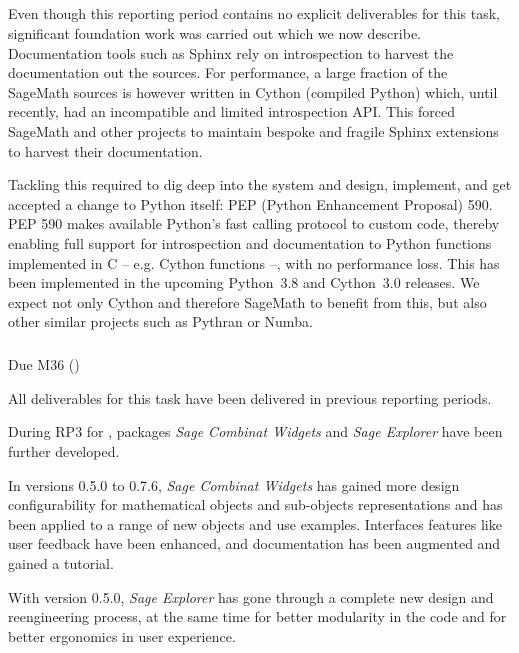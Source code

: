 \subparagraph{}
\label{UI@sage-sphinx}

Even though this reporting period contains no explicit deliverables
for this task, significant foundation work was carried out which we
now describe. Documentation tools such as Sphinx rely on introspection
to harvest the documentation out the sources. For performance, a large
fraction of the SageMath sources is however written in Cython
(compiled Python) which, until recently, had an incompatible and
limited introspection API. This forced SageMath and other projects to
maintain bespoke and fragile Sphinx extensions to harvest their
documentation.

Tackling this required to dig deep into the system and design,
implement, and get accepted a change to Python itself: PEP (Python
Enhancement Proposal) 590. PEP 590 makes available Python's fast
calling protocol to custom code, thereby enabling full support for
introspection and documentation to Python functions implemented in C
-- e.g. Cython functions --, with no performance loss. This has been
implemented in the upcoming Python~3.8 and Cython~3.0 releases. We
expect not only Cython and therefore SageMath to benefit from this,
but also other similar projects such as Pythran or Numba.

\subparagraph{} Due M36 ()
\label{UI@dynamic-inspect}

All deliverables for this task have been delivered in previous reporting periods.


During RP3 for , \ODK packages
\emph{Sage Combinat Widgets} and \emph{Sage Explorer} have been further developed.

In versions 0.5.0 to 0.7.6, \emph{Sage Combinat Widgets} has gained more design configurability
for mathematical objects and sub-objects representations and has been applied to a range of
new objects and use examples. Interfaces features like user feedback have been enhanced, and documentation
has been augmented and gained a tutorial.

With version 0.5.0, \emph{Sage Explorer} has gone through a complete new design and reengineering process,
at the same time for better modularity in the code and for better ergonomics in user experience.

